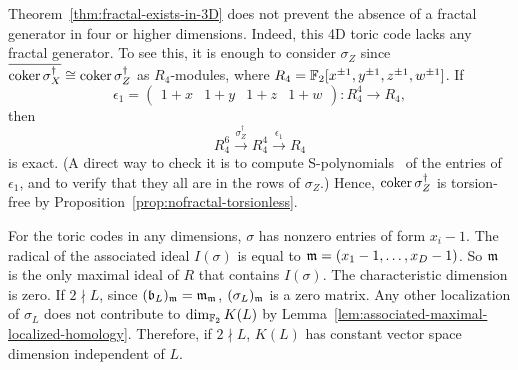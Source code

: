 \begin{example}
Theorem~\ref{thm:fractal-exists-in-3D} does not prevent
the absence of a fractal generator in four or higher dimensions.
Indeed, this 4D toric code lacks any fractal generator.
To see this, it is enough to consider $\sigma_Z$
since $\overline{\mathop{\mathrm{coker}}\nolimits \sigma_X^\dagger} \cong \mathop{\mathrm{coker}}\nolimits \sigma_Z^\dagger$ as $R_4$-modules,
where $R_4 = \mathbb{F}_2[x^{\pm 1},y^{\pm 1},z^{\pm 1},w^{\pm 1}]$.
If
\[
\epsilon_1 =
 \begin{pmatrix}
1+x & 1+y & 1+z & 1+w
 \end{pmatrix} : R_4^4 \to R_4,
\]
then
\[
 R_4^6 \xrightarrow{\sigma_Z^\dagger} R_4^4 \xrightarrow{\epsilon_1} R_4
\]
is exact.
(A direct way to check it is to compute S-polynomials~\cite[Chapter~15]{Eisenbud}
of the entries of $\epsilon_1$,
and to verify that they all are in the rows of $\sigma_Z$.)
Hence, $\mathop{\mathrm{coker}}\nolimits \sigma_Z^\dagger$ is torsion-free by Proposition~\ref{prop:nofractal-torsionless}.


For the toric codes in any dimensions, $\sigma$ has nonzero entries of form $x_i-1$.
The radical of the associated ideal $I(\sigma)$ is equal to $\mathfrak{m} = (x_1-1,\ldots, x_D-1)$.
So $\mathfrak{m}$ is the only maximal ideal of $R$ that contains $I(\sigma)$.
The characteristic dimension is zero.
If $2 \nmid L$, since $(\mathfrak{b}_L)_{\mathfrak{m}} = \mathfrak{m}_{\mathfrak{m}}$,
$(\sigma_L)_{\mathfrak{m}}$ is a zero matrix.
Any other localization of $\sigma_L$ does not contribute to $\dim_{\mathbb{F}_2} K(L)$
by Lemma~\ref{lem:associated-maximal-localized-homology}.
Therefore, if $2 \nmid L$, $K(L)$ has constant vector space dimension independent of $L$.


\end{example}
